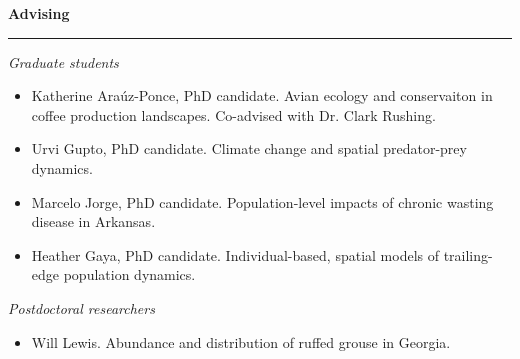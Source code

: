 {\large \bf Advising} \\
\rule[3mm]{\textwidth}{0.3mm}

{\it Graduate students}
\begin{itemize}
  \item Katherine Ara\'uz-Ponce, PhD candidate. Avian ecology and
    conservaiton in coffee production landscapes. Co-advised with
    Dr. Clark Rushing.
  \item Urvi Gupto, PhD candidate. Climate change and spatial
    predator-prey dynamics.  
  \item Marcelo Jorge, PhD candidate. Population-level impacts of
    chronic wasting disease in Arkansas.
  \item Heather Gaya, PhD candidate. Individual-based, spatial models
    of trailing-edge population dynamics.
\end{itemize}

\newpage
{\it Postdoctoral researchers}
\begin{itemize}
   \item Will Lewis. Abundance and distribution of ruffed grouse in
     Georgia. 
\end{itemize}


